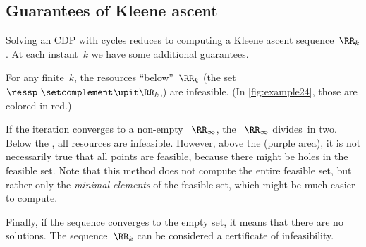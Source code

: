 \subsection{Guarantees of Kleene ascent}

Solving an CDP with cycles reduces to computing a Kleene ascent sequence~$\RR_{k}$.
At each instant~$k$ we have some additional guarantees.

For any finite~$k$, the resources ``below''~$\RR_{k}$ (the set~$\ressp\ \setcomplement\upit\RR_{k}$,) are infeasible.
(In \cref{fig:example24}, those are colored in red.)

If the iteration converges to a non-empty ~$\RR_{\infty}$, the ~$\RR_{\infty}$ divides~\ressp in two.
Below the , all resources are infeasible.
However, above the  (purple area), it is not necessarily true that all points are feasible, because there might be holes in the feasible set.
Note that this method does not compute the entire feasible set, but rather only the \emph{minimal elements} of the feasible set, which might be much easier to compute.

Finally, if the sequence converges to the empty set, it means that there are no solutions.
The sequence~$\RR_{k}$ can be considered a certificate of infeasibility.
